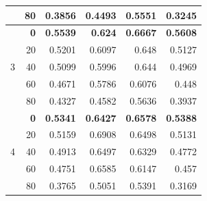 \documentclass[a4paper]{llncs}
\begin{document}
\begin{table}[htbp!]
{\begin{tabular}{crrrrr}
                   & \multicolumn{1}{l}{80}          & \multicolumn{1}{l}{0.3856}          & \multicolumn{1}{l}{0.4493}          & \multicolumn{1}{l}{0.5551}          & \multicolumn{1}{l}{0.3245}          \\ \hline
\multirow{5}{*}{3} & \textbf{0}                      & \textbf{0.5539}                     & \textbf{0.624}                      & \textbf{0.6667}                     & \textbf{0.5608}                     \\
                   & 20                              & 0.5201                              & 0.6097                              & 0.648                               & 0.5127                              \\
                   & 40                              & 0.5099                              & 0.5996                              & 0.644                               & 0.4969                              \\
                   & 60                              & 0.4671                              & 0.5786                              & 0.6076                              & 0.448                               \\
                   & 80                              & 0.4327                              & 0.4582                              & 0.5636                              & 0.3937                              \\ \hline
\multirow{5}{*}{4} & \textbf{0}                      & \textbf{0.5341}                     & \textbf{0.6427}                     & \textbf{0.6578}                     & \textbf{0.5388}                     \\
                   & 20                              & 0.5159                              & 0.6908                              & 0.6498                              & 0.5131                              \\
                   & 40                              & 0.4913                              & 0.6497                              & 0.6329                              & 0.4772                              \\
                   & 60                              & 0.4751                              & 0.6585                              & 0.6147                              & 0.457                               \\
                   & 80                              & 0.3765                              & 0.5051                              & 0.5391                              & 0.3169                              \\ \hline
\end{tabular}%
}
\end{table}
\end{document}
